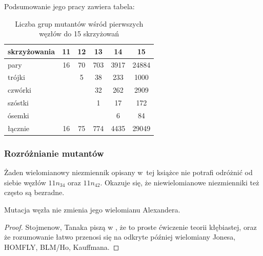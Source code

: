 Podsumowanie jego pracy zawiera tabela:

\begin{table}[H]
    \centering
    \begin{tabular}{lccccc} \toprule
        skrzyżowania & 11 & 12 & 13  & 14   & 15    \\ \midrule
        pary         & 16 & 70 & 703 & 3917 & 24884 \\
        trójki       &    & 5  & 38  & 233  & 1000  \\
        czwórki      &    &    & 32  & 262  & 2909  \\
        szóstki      &    &    & 1   & 17   & 172   \\
        ósemki       &    &    &     & 6    & 84    \\
        łącznie      & 16 & 75 & 774 & 4435 & 29049 \\
        \bottomrule
        \hline
    \end{tabular}
    \caption{Liczba grup mutantów wśród pierwszych węzłów do 15 skrzyżowań}
\end{table}

\subsubsection{Rozróżnianie mutantów}
Żaden wielomianowy niezmiennik opisany w~tej książce nie potrafi odróżnić od siebie węzłów $11n_{34}$ oraz $11n_{42}$.
Okazuje się, że niewielomianowe niezmienniki też często są bezradne.

\begin{proposition}
    Mutacja węzła nie zmienia jego wielomianu Alexandera.
%
\end{proposition}


\begin{proof}
    Stojmenow, Tanaka piszą w \cite{tanaka09}, że to proste ćwiczenie teorii kłębiastej, oraz że rozumowanie łatwo przenosi się na odkryte później wielomiany Jonesa, HOMFLY, BLM/Ho, Kauffmana.
\end{proof}

